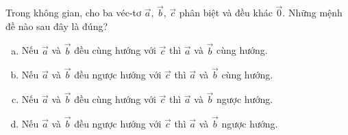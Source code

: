 \begin{bt}%
Trong không gian, cho ba véc-tơ $\overrightarrow{a}$, $\overrightarrow{b}$, $\overrightarrow{c}$ phân biệt và đều khác $\overrightarrow{0}$. Những mệnh đề nào sau đây là đúng?
	\begin{enumerate}[a)]	
		\item Nếu $\overrightarrow{a}$ và $\overrightarrow{b}$ đều cùng hướng với $\overrightarrow{c}$ thì $\overrightarrow{a}$ và $\overrightarrow{b}$ cùng hướng.
	\item 	Nếu $\overrightarrow{a}$ và $\overrightarrow{b}$ đều ngược hướng với $\overrightarrow{c}$ thì $\overrightarrow{a}$ và $\overrightarrow{b}$ cùng hướng.
\item 		Nếu $\overrightarrow{a}$ và $\overrightarrow{b}$ đều cùng hướng với $\overrightarrow{c}$ thì $\overrightarrow{a}$ và $\overrightarrow{b}$ ngược hướng.
\item 		Nếu $\overrightarrow{a}$ và $\overrightarrow{b}$ đều ngược hướng với $\overrightarrow{c}$ thì $\overrightarrow{a}$ và $\overrightarrow{b}$ ngược hướng.
	\end{enumerate}
\end{bt}

